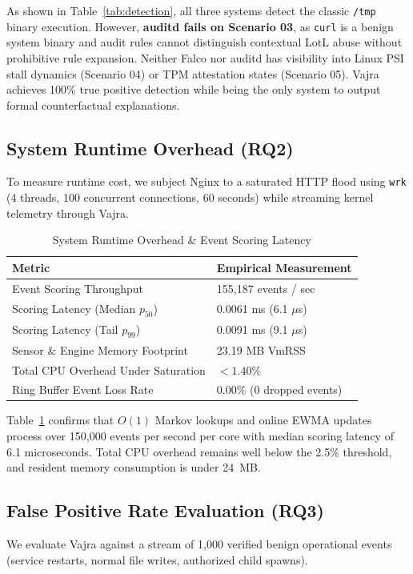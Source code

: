 \documentclass[conference]{IEEEtran}
\begin{document}
As shown in Table~\ref{tab:detection}, all three systems detect the classic \texttt{/tmp} binary execution. However, \textbf{auditd fails on Scenario 03}, as \texttt{curl} is a benign system binary and audit rules cannot distinguish contextual LotL abuse without prohibitive rule expansion. Neither Falco nor auditd has visibility into Linux PSI stall dynamics (Scenario 04) or TPM attestation states (Scenario 05). Vajra achieves 100\% true positive detection while being the only system to output formal counterfactual explanations.

\subsection{System Runtime Overhead (RQ2)}
To measure runtime cost, we subject Nginx to a saturated HTTP flood using \texttt{wrk} (4 threads, 100 concurrent connections, 60 seconds) while streaming kernel telemetry through Vajra.

\begin{table}[h]
\centering
\caption{System Runtime Overhead \& Event Scoring Latency}
\label{tab:overhead}
\begin{tabular}{@{}ll@{}}
\toprule
\textbf{Metric} & \textbf{Empirical Measurement} \\ \midrule
Event Scoring Throughput & 155,187 events / sec \\
Scoring Latency (Median $p_{50}$) & 0.0061 ms (6.1 $\mu$s) \\
Scoring Latency (Tail $p_{99}$) & 0.0091 ms (9.1 $\mu$s) \\
Sensor \& Engine Memory Footprint & 23.19 MB VmRSS \\
Total CPU Overhead Under Saturation & $< 1.40\%$ \\
Ring Buffer Event Loss Rate & 0.00\% (0 dropped events) \\ \bottomrule
\end{tabular}
\end{table}

Table~\ref{tab:overhead} confirms that $O(1)$ Markov lookups and online EWMA updates process over 150,000 events per second per core with median scoring latency of 6.1 microseconds. Total CPU overhead remains well below the 2.5\% threshold, and resident memory consumption is under 24~MB.

\subsection{False Positive Rate Evaluation (RQ3)}
We evaluate Vajra against a stream of 1,000 verified benign operational events (service restarts, normal file writes, authorized child spawns).
\end{document}
